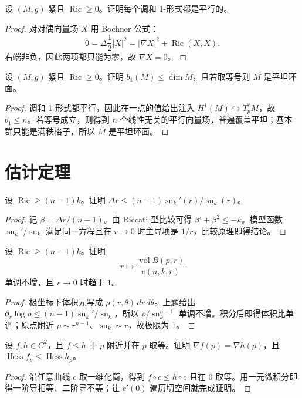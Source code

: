 \documentclass[11pt,a4paper,openany]{ctexbook}
\numberwithin{equation}{chapter}
\begin{document}
\begin{problem}
设 \((M,g)\) 紧且 \(\operatorname{Ric}\ge 0\)。证明每个调和 1-形式都是平行的。
\end{problem}
\begin{proof}
对对偶向量场 \(X\) 用 Bochner 公式：
\[
0=\Delta\frac12|X|^2=|\nabla X|^2+\operatorname{Ric}(X,X).
\]
右端非负，因此两项都只能为零，故 \(\nabla X=0\)。
\end{proof}

\begin{problem}
设 \((M,g)\) 紧且 \(\operatorname{Ric}\ge 0\)。证明 \(b_1(M)\le \dim M\)，且若取等号则 \(M\) 是平坦环面。
\end{problem}
\begin{proof}
调和 1-形式都平行，因此在一点的值给出注入 \(H^1(M)\hookrightarrow T_p^*M\)，故 \(b_1\le n\)。若等号成立，则得到 \(n\) 个线性无关的平行向量场，普遍覆盖平坦；基本群只能是满秩格子，所以 \(M\) 是平坦环面。
\end{proof}

\section{估计定理}

\begin{problem}
设 \(\operatorname{Ric}\ge (n-1)k\)。证明 \(\Delta r\le (n-1)\operatorname{sn}_k'(r)/\operatorname{sn}_k(r)\)。
\end{problem}
\begin{proof}
记 \(\beta=\Delta r/(n-1)\)。由 Riccati 型比较可得 \(\beta'+\beta^2\le -k\)。模型函数 \(\operatorname{sn}_k'/\operatorname{sn}_k\) 满足同一方程且在 \(r\to0\) 时主导项是 \(1/r\)，比较原理即得结论。
\end{proof}

\begin{problem}
设 \(\operatorname{Ric}\ge (n-1)k\)。证明
\[
r\mapsto \frac{\operatorname{vol}B(p,r)}{v(n,k,r)}
\]
单调不增，且 \(r\to0\) 时趋于 \(1\)。
\end{problem}
\begin{proof}
极坐标下体积元写成 \(\rho(r,\theta)\,dr\,d\theta\)。上题给出 \(\partial_r\log\rho\le (n-1)\operatorname{sn}_k'/\operatorname{sn}_k\)，所以 \(\rho/\operatorname{sn}_k^{n-1}\) 单调不增。积分后即得体积比单调；原点附近 \(\rho\sim r^{n-1}\)、\(\operatorname{sn}_k\sim r\)，故极限为 1。
\end{proof}

\begin{problem}
设 \(f,h\in C^2\)，且 \(f\le h\) 于 \(p\) 附近并在 \(p\) 取等。证明 \(\nabla f(p)=\nabla h(p)\)，且 \(\operatorname{Hess}f_p\le \operatorname{Hess}h_p\)。
\end{problem}
\begin{proof}
沿任意曲线 \(c\) 取一维化简，得到 \(f\circ c\le h\circ c\) 且在 \(0\) 取等。用一元微积分即得一阶导相等、二阶导不等；让 \(c'(0)\) 遍历切空间就完成证明。
\end{proof}
\end{document}
